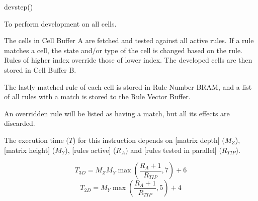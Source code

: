 

\format

devstep()

\purpose

To perform development on all cells.

\description

The cells in Cell Buffer A are fetched and tested against all active rules.
If a rule matches a cell, the state and/or type of the cell is changed based on the rule.
Rules of higher index override those of lower index.
The developed cells are then stored in Cell Buffer B.

The lastly matched rule of each cell is stored in Rule Number BRAM, and a list of all rules with a match is stored to the Rule Vector Buffer.

\notes

An overridden rule will be listed as having a match, but all its effects are discarded.

The execution time ($T$) for this instruction depends on [matrix depth] ($M_Z$), [matrix height] ($M_Y$), [rules active] ($R_A$) and [rules tested in parallel] ($R_{TIP}$).

$$ T_{3D} = M_Z M_Y \max \left( \frac{ R_A + 1 }{ R_{TIP} }, 7 \right) + 6 $$
$$ T_{2D} = M_Y \max \left( \frac{ R_A + 1 }{ R_{TIP} }, 5 \right) + 4 $$
